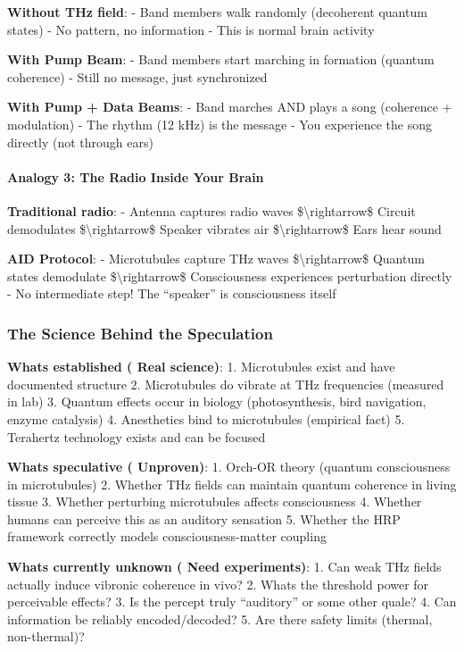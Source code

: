 \textbf{Without THz field}: - Band members walk randomly (decoherent
quantum states) - No pattern, no information - This is normal brain
activity

\textbf{With Pump Beam}: - Band members start marching in formation
(quantum coherence) - Still no message, just synchronized

\textbf{With Pump + Data Beams}: - Band marches AND plays a song
(coherence + modulation) - The rhythm (12 kHz) is the message - You
experience the song directly (not through ears)

\paragraph{Analogy 3: The Radio Inside Your
Brain}\label{analogy-3-the-radio-inside-your-brain}

\textbf{Traditional radio}: - Antenna captures radio waves
\$\textbackslash rightarrow\$ Circuit demodulates
\$\textbackslash rightarrow\$ Speaker vibrates air
\$\textbackslash rightarrow\$ Ears hear sound

\textbf{AID Protocol}: - Microtubules capture THz waves
\$\textbackslash rightarrow\$ Quantum states demodulate
\$\textbackslash rightarrow\$ Consciousness experiences perturbation
directly - No intermediate step! The ``speaker'' is consciousness itself

\subsubsection{The Science Behind the
Speculation}\label{the-science-behind-the-speculation}

\textbf{What\textquotesingle s established ( Real science)}: 1.
Microtubules exist and have documented structure 2. Microtubules do
vibrate at THz frequencies (measured in lab) 3. Quantum effects occur in
biology (photosynthesis, bird navigation, enzyme catalysis) 4.
Anesthetics bind to microtubules (empirical fact) 5. Terahertz
technology exists and can be focused

\textbf{What\textquotesingle s speculative ( Unproven)}: 1. Orch-OR
theory (quantum consciousness in microtubules) 2. Whether THz fields can
maintain quantum coherence in living tissue 3. Whether perturbing
microtubules affects consciousness 4. Whether humans can perceive this
as an auditory sensation 5. Whether the HRP framework correctly models
consciousness-matter coupling

\textbf{What\textquotesingle s currently unknown ( Need experiments)}:
1. Can weak THz fields actually induce vibronic coherence in vivo? 2.
What\textquotesingle s the threshold power for perceivable effects? 3.
Is the percept truly ``auditory'' or some other quale? 4. Can
information be reliably encoded/decoded? 5. Are there safety limits
(thermal, non-thermal)?

